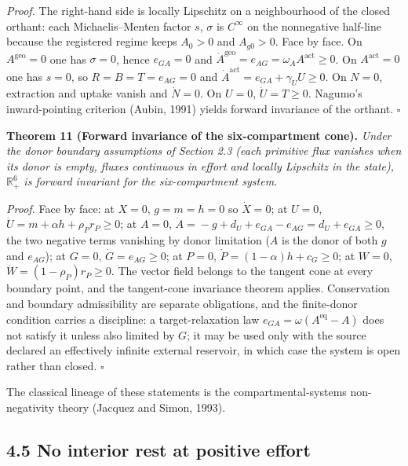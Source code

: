 \documentclass[11pt]{article}
\begin{document}
\emph{Proof.} The right-hand side is locally Lipschitz on a neighbourhood of the closed orthant: each Michaelis--Menten factor \(s\), \(\sigma\) is \(C^\infty\) on the nonnegative half-line because the registered regime keeps \(A_0 > 0\) and \(A_{g0} > 0\). Face by face. On \(A^{\mathrm{geo}} = 0\) one has \(\sigma = 0\), hence \(e_{GA} = 0\) and \(\dot A^{\mathrm{geo}} =\allowbreak{} e_{AG} =\allowbreak{} \omega_A A^{\mathrm{act}} \ge 0\). On \(A^{\mathrm{act}} = 0\) one has \(s = 0\), so \(R = B = T = e_{AG} = 0\) and \(\dot A^{\mathrm{act}} =\allowbreak{} e_{GA} +\allowbreak{} \gamma_U U \ge 0\). On \(N = 0\), extraction and uptake vanish and \(\dot N = 0\). On \(U = 0\), \(\dot U = T \ge 0\). Nagumo's inward-pointing criterion (Aubin, 1991) yields forward invariance of the orthant. \(\square\)

\textbf{Theorem 11 (Forward invariance of the six-compartment cone).} \emph{Under the donor boundary assumptions of Section 2.3 (each primitive flux vanishes when its donor is empty, fluxes continuous in effort and locally Lipschitz in the state), \(\mathbb{R}^6_+\) is forward invariant for the six-compartment system.}

\emph{Proof.} Face by face: at \(X = 0\), \(g = m = h = 0\) so \(\dot X = 0\); at \(U = 0\), \(\dot U =\allowbreak{} m +\allowbreak{} \alpha h +\allowbreak{} \rho_P r_P \ge 0\); at \(A = 0\), \(\dot A =\allowbreak{} -g +\allowbreak{} d_U +\allowbreak{} e_{GA} - e_{AG} =\allowbreak{} d_U +\allowbreak{} e_{GA} \ge 0\), the two negative terms vanishing by donor limitation (\(A\) is the donor of both \(g\) and \(e_{AG}\)); at \(G = 0\), \(\dot G = e_{AG} \ge 0\); at \(P = 0\), \(\dot P =\allowbreak{} (1-\alpha)h +\allowbreak{} c_G \ge 0\); at \(W = 0\), \(\dot W = (1-\rho_P)r_P \ge 0\). The vector field belongs to the tangent cone at every boundary point, and the tangent-cone invariance theorem applies. Conservation and boundary admissibility are separate obligations, and the finite-donor condition carries a discipline: a target-relaxation law \(e_{GA} =\allowbreak{} \omega(A^{\mathrm{eq}} - A)\) does not satisfy it unless also limited by \(G\); it may be used only with the source declared an effectively infinite external reservoir, in which case the system is open rather than closed. \(\square\)

The classical lineage of these statements is the compartmental-systems non-negativity theory (Jacquez and Simon, 1993).

\subsection*{4.5 No interior rest at positive effort}\label{45-no-interior-rest-at-positive-effort}
\end{document}
